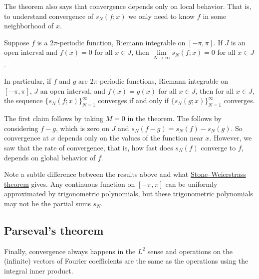 The theorem also says that convergence depends only on local behavior.
That is, to understand convergence of $s_N(f;x)$ we only need to know
$f$ in some neighborhood of $x$.

\begin{cor}
Suppose $f$ is a $2\pi$-periodic function, Riemann integrable on $[-\pi,\pi]$.
If $J$ is an open interval and $f(x) = 0$ for all $x \in J$,
then $\lim\limits_{N\to\infty} s_N(f;x) = 0$ for all $x \in J$.

In particular, if $f$ and $g$ are $2\pi$-periodic functions,
Riemann integrable on $[-\pi,\pi]$, $J$ an open interval, and $f(x) = g(x)$
for all $x \in J$, then for all $x \in J$,
the sequence
$\bigl\{ s_N(f;x) \bigr\}_{N=1}^\infty$ converges if and only if
$\bigl\{ s_N(g;x) \bigr\}_{N=1}^\infty$ converges.
\end{cor}

The first claim follows by taking $M=0$ in the theorem.
The  follows by considering $f-g$, which
is zero on $J$ and $s_N(f-g) = s_N(f) - s_N(g)$.
So convergence at $x$ depends only on the values of the function
near $x$.
However, we saw that the rate of convergence,
that is, how fast does $s_N(f)$
converge to $f$, depends on global behavior of $f$.

Note a subtle difference between the results above and what 
\hyperref[thm:SWcomplex]{Stone--Weierstrass theorem} gives.
Any continuous function on $[-\pi,\pi]$ can be uniformly approximated
by trigonometric polynomials, but these trigonometric polynomials may
not be the partial sums $s_N$.

\subsection{Parseval's theorem}

Finally,
convergence always happens in the $L^2$ sense and
operations on the (infinite) vectors of
Fourier coefficients are the same as the operations using the integral
inner product.

